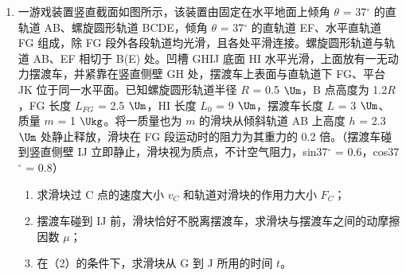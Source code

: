 \documentclass[\gkver]{gaokaozhenti}
\begin{document}
\begin{enumerate}
\item
一游戏装置竖直截面如图所示，该装置由固定在水平地面上倾角 $\theta$ = 37${^\circ}$ 的直轨道 AB、螺旋圆形轨道 BCDE，倾角 $\theta$ = 37${^\circ}$ 的直轨道 EF、水平直轨道 FG 组成，除 FG 段外各段轨道均光滑，且各处平滑连接。螺旋圆形轨道与轨道 AB、EF 相切于 B(E) 处。凹槽 GHIJ 底面 HI 水平光滑，上面放有一无动力摆渡车，并紧靠在竖直侧壁 GH 处，摆渡车上表面与直轨道下 FG、平台 JK 位于同一水平面。已知螺旋圆形轨道半径 $R$ = 0.5 $\Um$，B 点高度为 1.2$R$，FG 长度 $L_{FG}$ = 2.5 $\Um$，HI 长度 $L_{0}$ = 9 $\Um$，摆渡车长度 $L$ = 3 $\Um$、质量 $m$ = 1 $\Ukg$。将一质量也为 $m$ 的滑块从倾斜轨道 AB 上高度 $h$ = 2.3 $\Um$ 处静止释放，滑块在 FG 段运动时的阻力为其重力的 0.2 倍。（摆渡车碰到竖直侧壁 IJ 立即静止，滑块视为质点，不计空气阻力，sin37${^\circ}$ = 0.6，cos37${^\circ}$ = 0.8）
\begin{enumerate}
	\item
	求滑块过 C 点的速度大小 $v_{C}$ 和轨道对滑块的作用力大小 $F_{C}$；
	\item
	摆渡车碰到 IJ 前，滑块恰好不脱离摆渡车，求滑块与摆渡车之间的动摩擦因数 $\mu$；
	\item
	在（2）的条件下，求滑块从 G 到 J 所用的时间 $t$。
\end{enumerate}
\onepicture[align=right, w=13.30cm]{}
\end{enumerate}
\end{document}
